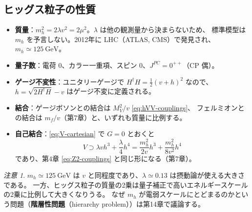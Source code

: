 \documentclass[uplatex,dvipdfmx,a4paper,11pt,openany]{jsbook}
\newcommand{\term}[2]{\textbf{#1}（#2）}
\numberwithin{equation}{chapter}
\theoremstyle{definition}
\theoremstyle{plain}
\theoremstyle{remark}
\newtheorem{remark}{注意}[chapter]
\begin{document}
\subsection{ヒッグス粒子の性質}
\begin{itemize}
    \item \textbf{質量}：$m_h^2=2\lambda v^2=2\mu^2$。$\lambda$ は他の観測量から決まらないため、
    標準模型は $m_h$ を予言しない。2012年に LHC（ATLAS, CMS）で発見され、$m_h\simeq125\ \mathrm{GeV}$。
    \item \textbf{量子数}：電荷 0、カラー一重項、スピン 0、$J^{PC}=0^{++}$（CP 偶）。
    \item \textbf{ゲージ不変性}：ユニタリーゲージで $H^\dagger H=\frac12(v+h)^2$ なので、
    $h=\sqrt{2H^\dagger H}-v$ はゲージ不変に定義される。
    \item \textbf{結合}：ゲージボソンとの結合は $M_V^2/v$ \eqref{eq:hVV-couplings}、
    フェルミオンとの結合は $m_f/v$（第7章）と、いずれも質量に比例する。
    \item \textbf{自己結合}：\eqref{eq:V-cartesian} で $G=0$ とおくと
    \begin{equation}
    V\supset\lambda vh^3+\frac\lambda4h^4=\frac{m_h^2}{2v}h^3+\frac{m_h^2}{8v^2}h^4
    \end{equation}
    であり、第4章 \eqref{eq:Z2-couplings} と同じ形になる（第7章）。
\end{itemize}
\begin{remark}
$m_h\simeq125\ \mathrm{GeV}$ は $v$ と同程度であり、$\lambda\simeq0.13$ は摂動論が使える大きさである。
一方、ヒッグス粒子の質量の2乗は量子補正で高いエネルギースケールの2乗に比例して大きくなりうる。
なぜ $m_h$ が電弱スケールにとどまるのかという問題（\term{階層性問題}{hierarchy problem}）は第14章で議論する。
\end{remark}
\end{document}
